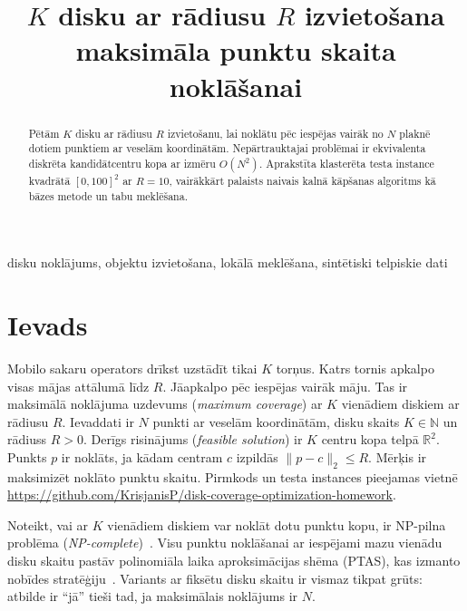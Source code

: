 \documentclass[conference]{IEEEtran}
\begin{document}
\title{\texorpdfstring{$K$}{K} disku ar rādiusu \texorpdfstring{$R$}{R} izvietošana maksimāla punktu skaita noklāšanai}

\author{
}

\maketitle

\begin{abstract}
Pētām $K$ disku ar rādiusu $R$ izvietošanu, lai noklātu pēc iespējas vairāk no $N$ plaknē dotiem punktiem ar veselām koordinātām.
Nepārtrauktajai problēmai ir ekvivalenta diskrēta kandidātcentru kopa ar izmēru $O(N^2)$.
Aprakstīta klasterēta testa instance kvadrātā $[0,100]^2$ ar $R=10$, vairākkārt palaists naivais kalnā kāpšanas algoritms kā bāzes metode un tabu meklēšana.
\end{abstract}

\begin{IEEEkeywords}
disku noklājums, objektu izvietošana, lokālā meklēšana, sintētiski telpiskie dati
\end{IEEEkeywords}

\section{Ievads}

Mobilo sakaru operators drīkst uzstādīt tikai $K$ torņus.
Katrs tornis apkalpo visas mājas attālumā līdz $R$.
Jāapkalpo pēc iespējas vairāk māju.
Tas ir maksimālā noklājuma uzdevums (\textit{maximum coverage}) ar $K$ vienādiem diskiem ar rādiusu $R$.
Ievaddati ir $N$ punkti ar veselām koordinātām, disku skaits $K\in\mathbb{N}$ un rādiuss $R>0$.
Derīgs risinājums (\textit{feasible solution}) ir $K$ centru kopa telpā $\mathbb{R}^2$.
Punkts $p$ ir noklāts, ja kādam centram $c$ izpildās $\|p-c\|_2\le R$.
Mērķis ir maksimizēt noklāto punktu skaitu.
Pirmkods un testa instances pieejamas vietnē \url{https://github.com/KrisjanisP/disk-coverage-optimization-homework}.

Noteikt, vai ar $K$ vienādiem diskiem var noklāt dotu punktu kopu, ir NP-pilna problēma (\textit{NP-complete})~\cite{Megiddo1984}.
Visu punktu noklāšanai ar iespējami mazu vienādu disku skaitu pastāv polinomiāla laika aproksimācijas shēma (PTAS), kas izmanto nobīdes stratēģiju~\cite{Hochbaum1985}.
Variants ar fiksētu disku skaitu ir vismaz tikpat grūts: atbilde ir ``jā'' tieši tad, ja maksimālais noklājums ir $N$.
\end{document}
